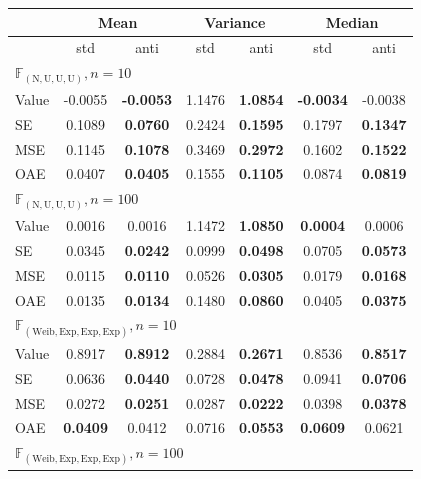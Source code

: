\begin{table}[htbp]
\centering
\begin{tabular}{l|cc|cc|cc}
\hline
 & \multicolumn{2}{c|}{Mean} & \multicolumn{2}{c|}{Variance} & \multicolumn{2}{c}{Median} \\
  \hline
 & std & anti & std & anti & std & anti \\
  \hline

\multicolumn{7}{l}{$\mathbb{F}_{(\mathrm{N,U,U,U})}, n=10$} \\

  \hline
Value & -0.0055 & \textbf{-0.0053} & 1.1476 & \textbf{1.0854} & \textbf{-0.0034} & -0.0038 \\
  SE & 0.1089 & \textbf{0.0760} & 0.2424 & \textbf{0.1595} & 0.1797 & \textbf{0.1347} \\
  MSE & 0.1145 & \textbf{0.1078} & 0.3469 & \textbf{0.2972} & 0.1602 & \textbf{0.1522} \\
  OAE & 0.0407 & \textbf{0.0405} & 0.1555 & \textbf{0.1105} & 0.0874 & \textbf{0.0819} \\
   \hline

\multicolumn{7}{l}{$\mathbb{F}_{(\mathrm{N,U,U,U})}, n=100$} \\
  \hline
Value & 0.0016 & 0.0016 & 1.1472 & \textbf{1.0850} & \textbf{0.0004} & 0.0006 \\
  SE & 0.0345 & \textbf{0.0242} & 0.0999 & \textbf{0.0498} & 0.0705 & \textbf{0.0573} \\
  MSE & 0.0115 & \textbf{0.0110} & 0.0526 & \textbf{0.0305} & 0.0179 & \textbf{0.0168} \\
  OAE & 0.0135 & \textbf{0.0134} & 0.1480 & \textbf{0.0860} & 0.0405 & \textbf{0.0375} \\
  \hline
\multicolumn{7}{l}{$\mathbb{F}_{(\mathrm{Weib,Exp,Exp,Exp})}, n=10$} \\
  \hline

Value & 0.8917 & \textbf{0.8912} & 0.2884 & \textbf{0.2671} & 0.8536 & \textbf{0.8517} \\
  SE & 0.0636 & \textbf{0.0440} & 0.0728 & \textbf{0.0478} & 0.0941 & \textbf{0.0706} \\
  MSE & 0.0272 & \textbf{0.0251} & 0.0287 & \textbf{0.0222} & 0.0398 & \textbf{0.0378} \\
  OAE & \textbf{0.0409} & 0.0412 & 0.0716 & \textbf{0.0553} & \textbf{0.0609} & 0.0621 \\

  \hline
\multicolumn{7}{l}{$\mathbb{F}_{(\mathrm{Weib,Exp,Exp,Exp})}, n=100$} \\
  \hline


\end{tabular}
\end{table}
